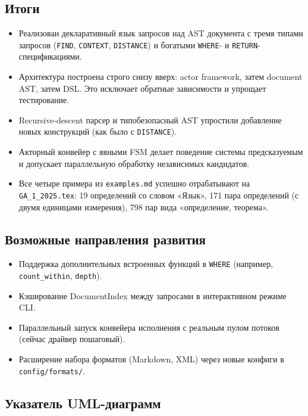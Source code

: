 \documentclass[12pt,a4paper]{article}
\newcommand{\code}[1]{\texttt{#1}}
\begin{document}
\subsection{Итоги}

\begin{itemize}
  \item Реализован декларативный язык запросов над AST документа с
        тремя типами запросов (\code{FIND}, \code{CONTEXT},
        \code{DISTANCE}) и богатыми \code{WHERE}- и
        \code{RETURN}-спецификациями.
  \item Архитектура построена строго снизу вверх: actor framework,
        затем document AST, затем DSL. Это исключает обратные
        зависимости и упрощает тестирование.
  \item Recursive-descent парсер и типобезопасный AST упростили
        добавление новых конструкций (как было с \code{DISTANCE}).
  \item Акторный конвейер с явными FSM делает поведение системы
        предсказуемым и допускает параллельную обработку независимых
        кандидатов.
  \item Все четыре примера из \code{examples.md} успешно отрабатывают
        на \code{GA\_1\_2025.tex}: 19 определений со словом «Язык»,
        171 пара определений (с двумя единицами измерения), 798 пар
        вида «определение, теорема».
\end{itemize}

\subsection{Возможные направления развития}

\begin{itemize}
  \item Поддержка дополнительных встроенных функций в \code{WHERE}
        (например, \code{count\_within}, \code{depth}).
  \item Кэширование DocumentIndex между запросами в интерактивном
        режиме CLI.
  \item Параллельный запуск конвейера исполнения с реальным пулом
        потоков (сейчас драйвер пошаговый).
  \item Расширение набора форматов (Markdown, XML) через новые
        конфиги в \code{config/formats/}.
\end{itemize}

\subsection{Указатель UML-диаграмм}
\end{document}
